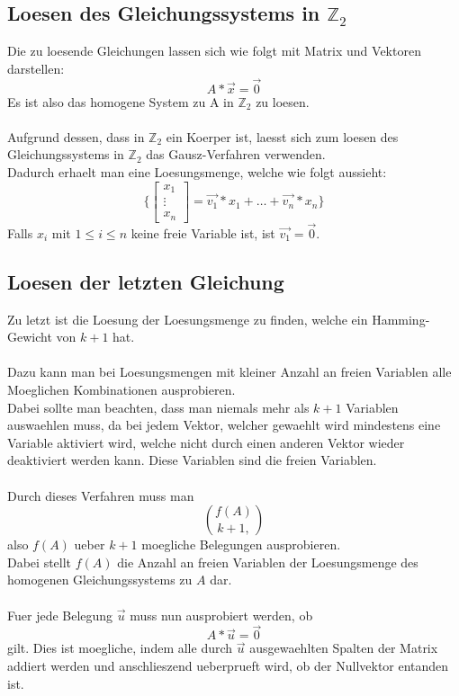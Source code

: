 \documentclass[a4paper,10pt,ngerman]{scrartcl}
\begin{document}
\subsection{Loesen des Gleichungssystems in \(\mathbb{Z}_{2}\)}
Die zu loesende Gleichungen lassen sich wie folgt mit Matrix und Vektoren darstellen:
\[A * \vec{x} = \vec{0}\]
Es ist also das homogene System zu A in \(\mathbb{Z}_{2}\) zu loesen.\\\\
Aufgrund dessen, dass in \(\mathbb{Z}_{2}\) ein Koerper ist, laesst sich zum loesen des Gleichungssystems in \(\mathbb{Z}_{2}\) das Gausz-Verfahren verwenden.\\
Dadurch erhaelt man eine Loesungsmenge, welche wie folgt aussieht:
\[ \{ \begin{bmatrix}
           x_{1} \\
           \vdots \\
           x_{n}
         \end{bmatrix} = \vec{v_1} * x_1 + \dots + \vec{v_n} * x_n \} 
\]
Falls \(x_i\) mit \(1 \leq i \leq n\) keine freie Variable ist, ist \(\vec{v_1} = \vec{0}\).			

\subsection{Loesen der letzten Gleichung}
Zu letzt ist die Loesung der Loesungsmenge zu finden, welche ein Hamming-Gewicht von $k+1$ hat.\\
\\
Dazu kann man bei Loesungsmengen mit kleiner Anzahl an freien Variablen alle Moeglichen Kombinationen ausprobieren.\\
Dabei sollte man beachten, dass man niemals mehr als $k+1$ Variablen auswaehlen muss, da bei jedem Vektor, welcher gewaehlt wird mindestens eine Variable aktiviert wird, welche nicht durch einen anderen Vektor wieder deaktiviert werden kann. Diese Variablen sind die freien Variablen.\\
\\
Durch dieses Verfahren muss man 
$$
{f(A)}\choose{k+1},
$$
also $f(A)$ ueber $k+1$ moegliche Belegungen ausprobieren.\\
Dabei stellt $f(A)$ die Anzahl an freien Variablen der Loesungsmenge des homogenen Gleichungssystems zu $A$ dar.\\
\\
Fuer jede Belegung $\vec{u}$ muss nun ausprobiert werden, ob 
$$
A*\vec{u} = \vec{0}
$$
gilt. Dies ist moegliche, indem alle durch $\vec{u}$ ausgewaehlten Spalten der Matrix addiert werden und anschlieszend ueberprueft wird, ob der Nullvektor entanden ist.
\end{document}

